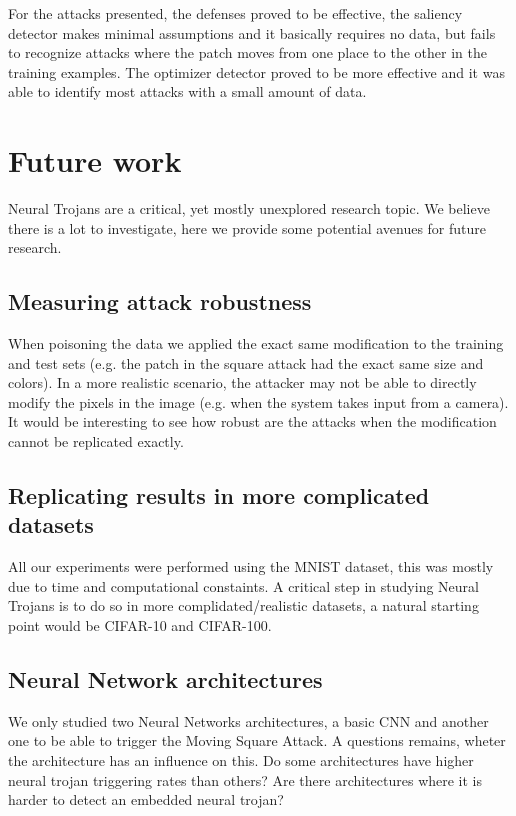 \documentclass[letterpaper, 10 pt, conference]{ieeeconf}  %
\begin{document}
For the attacks presented, the defenses proved to be effective, the saliency
detector makes minimal assumptions and it basically requires no data, but fails
to recognize attacks where the patch moves from one place to the other in the
training examples. The optimizer detector proved to be more effective and it
was able to identify most attacks with a small amount of data.


\section{Future work}

Neural Trojans are a critical, yet mostly unexplored research topic. We believe
there is a lot to investigate, here we provide some potential avenues for
future research.

\subsection{Measuring attack robustness}

When poisoning the data we applied the exact same modification to the training
and test sets (e.g. the patch in the square attack had the exact same size and
colors). In a more realistic scenario, the attacker may not be able to directly
modify the pixels in the image (e.g. when the system takes input from a
camera). It would be interesting to see how robust are the attacks when the
modification cannot be replicated exactly.

\subsection{Replicating results in more complicated datasets}

All our experiments were performed using the MNIST dataset, this was mostly due
to time and computational constaints. A critical step in studying Neural
Trojans is to do so in more complidated/realistic datasets, a natural starting
point would be CIFAR-10 and CIFAR-100.

\subsection{Neural Network architectures}

We only studied two Neural Networks architectures, a basic CNN and another one
to be able to trigger the Moving Square Attack. A questions remains, wheter
the architecture has an influence on this. Do some architectures have higher
neural trojan triggering rates than others? Are there architectures where it
is harder to detect an embedded neural trojan?
\end{document}
